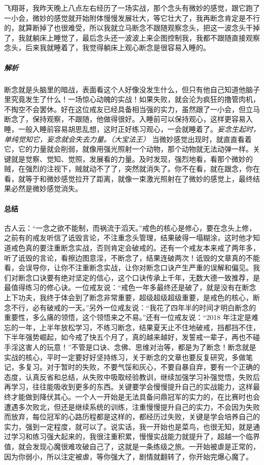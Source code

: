 \begin{case}[如何战胜微妙的感觉]
    飞翔哥，我昨天晚上八点左右经历了一场实战，那个念头有微妙的感觉，跟它跑了一小会，微妙的感觉就开始附体慢慢发展壮大，等它壮大了，我再断念肯定是不行的，就算断掉了也很难受，所以我就立马断念不跟随观察念头，把这一波念头干掉了，我就躺床上睡觉了，最后念头还一波波上来企图控制我，我都不跟随直接观察念头，后来我就睡着了，我觉得躺床上观心断念是很容易入睡的。
    \subparagraph{解析} 断念就是头脑里的暗战，表面看这个人好像没发生什么，但只有他自己知道他脑子里究竟发生了什么！一场惊心动魄的实战！如果失败，就会沦为疯狂的撸管肉机，不掏空不会罢休。好在这位戒友已经具备相当强的实力，虽然跟了一小会，但立马断念了，保持观察，不跟随，他做得很好。入睡前可以保持观心，这样更容易入睡，一般入睡前容易胡思乱想，这时正好练习观心，一会就睡着了。\textit{妄念生起时，单纯觉知它，妄念就会失去力量。（大宝法王）} 当微妙感觉出现时，就直直看着它，它的力量就会削弱，就像用强光照射一个动物，那个动物就无法动弹一样。关键就是觉察、觉知、觉照，发展看的力量。及时发现，强烈地看，看那个微妙的贼，在强烈的注视下，贼就动不了了，突然就消失了。你不在看，就在跟念，你在看，就等于和微妙感觉拉开了距离，就像一束激光照射在了微妙的感觉上，最终结果必然是微妙感觉消失。
\end{case}

\paragraph{总结}

古人云：“一念之欲不能制，而祸流于滔天。”戒色的核心是修心，要在念头上修，之前有的戒友听信了诋毁言论，不注重念头管理，结果破得一塌糊涂，这时他才知道戒色真的要注重断念实战，否则肯定会破戒的。还有一个戒友本来戒了两年多，听了诋毁的言论，看擦边图意淫，不断念了，结果连破两次！诋毁的文章真的不能看，会误导你，让你不注重断念实战，让你对断念口诀产生严重的误解和偏见。我们对断念口诀要有绝对坚定的信心，这个口诀传承上千年，无数大德一致推荐，是最值得练习的修心诀。一位戒友说：“戒色一年多最终还是破了，就是没有在断念上下功夫，我终于体会到了断念非常重要，超级超级超级重要，是戒色的核心，断念不行，必有破戒的一天。”另外一位戒友说：“我花了四年半的时间才明白断念的重要性，多么痛的领悟，这个领悟来之不易。”还有一位戒友说：“2018 年注定是难忘的一年，上半年放松学习，不练习断念，结果夏天止不住地破戒，挡都挡不住，下半年强势崛起，如今戒了快五个月了，真的越来越好，发誓戒一辈子，再也不碰手淫这害人的玩意！”不管是口诀、念佛、思维对治等，都是为了断念！断念就是实战的核心，平时一定要好好坚持练习，关于断念的文章也要反复研究，多做笔记，多复习。对于暂时的失败，不要气馁和灰心，不要自暴自弃，要有一个正确的态度，认真反省和总结，从失败中吸取经验教训，继续加强学习补强觉悟，失败后再学习，往往能吸收到更多的东西。关键要学会慢慢提升自己的实战能力，这样最终才能做到降伏其心。一个人一开始是无法具备问鼎冠军的实力的，在比赛时也会遭遇多次败北，但还是继续系统的训练，注重慢慢提升自己的实力，不会因为失败而放弃，每位冠军的心路历程都是这样的，都经历过失败，关键是学会培养自己的实力，强到一定程度，就可以了。说实话，我一开始也是菜鸟，也很无知，就是通过学习和练习强大起来的，我很注重积累，慢慢实战能力就提升了，超越一个临界值，就会发现心魔很难攻破自己了，这就是一条练级之旅。一开始被虐是正常的，因为你弱小，所以注定被虐，等你强大了，剧情就翻转了，你开始完爆心魔了。

